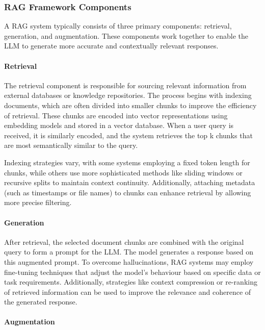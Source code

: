 \subsubsection{RAG Framework Components}
\label{sec:RAG}
A RAG system typically consists of three primary components: retrieval, generation, and augmentation. These components work together to enable the LLM to generate more accurate and contextually relevant responses.

\paragraph{Retrieval}

The retrieval component is responsible for sourcing relevant information from external databases or knowledge repositories. The process begins with indexing documents, which are often divided into smaller chunks to improve the efficiency of retrieval. These chunks are encoded into vector representations using embedding models and stored in a vector database. When a user query is received, it is similarly encoded, and the system retrieves the top k chunks that are most semantically similar to the query.

Indexing strategies vary, with some systems employing a fixed token length for chunks, while others use more sophisticated methods like sliding windows or recursive splits to maintain context continuity. Additionally, attaching metadata (such as timestamps or file names) to chunks can enhance retrieval by allowing more precise filtering.

\paragraph{Generation}

After retrieval, the selected document chunks are combined with the original query to form a prompt for the LLM. The model generates a response based on this augmented prompt. 
To overcome hallucinations, RAG systems may employ fine-tuning techniques that adjust the model's behaviour based on specific data or task requirements. Additionally, strategies like context compression or re-ranking of retrieved information can be used to improve the relevance and coherence of the generated response.

\paragraph{Augmentation}


